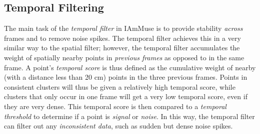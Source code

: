 \subsection{Temporal Filtering}
\label{sub-section: tracking method - data filtering - temporal filtering}

The main task of the \textit{temporal filter} in IAmMuse is to provide stability \textit{across} frames and to remove noise spikes.
The temporal filter achieves this in a very similar way to the spatial filter; however, the temporal filter accumulates the weight of spatially nearby points in \textit{previous frames} as opposed to in the same frame.
A point's \textit{temporal score} is thus defined as the cumulative weight of nearby (with a distance less than 20 cm) points in the three previous frames.
Points in consistent clusters will thus be given a relatively high temporal score, while clusters that only occur in one frame will get a very low temporal score, even if they are very dense.
This temporal score is then compared to a \textit{temporal threshold} to determine if a point is \textit{signal} or \textit{noise}.
In this way, the temporal filter can filter out any \textit{inconsistent data}, such as sudden but dense noise spikes.






